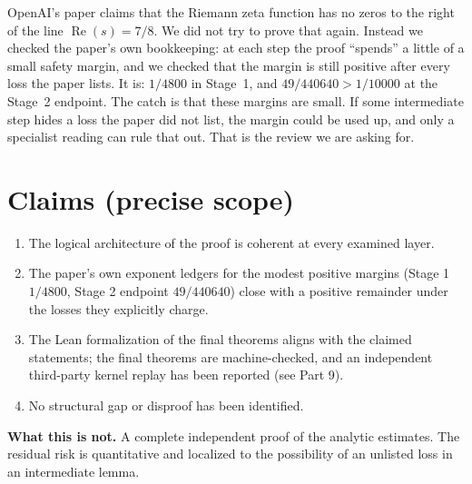 \documentclass[11pt]{article}
\begin{document}
\begin{tcolorbox}[colback=plain,colframe=orange!60!black,boxrule=0.5pt,arc=2pt,left=10pt,right=10pt,top=6pt,bottom=6pt,title=\textbf{Summary for non-specialists},fonttitle=\small,colbacktitle=orange!60!black]
OpenAI's paper claims that the Riemann zeta function has no zeros to the right of the line $\operatorname{Re}(s)=7/8$. We did not try to prove that again. Instead we checked the paper's own bookkeeping: at each step the proof ``spends'' a little of a small safety margin, and we checked that the margin is still positive after every loss the paper lists. It is: $1/4800$ in Stage~1, and $49/440640 > 1/10000$ at the Stage~2 endpoint. The catch is that these margins are small. If some intermediate step hides a loss the paper did not list, the margin could be used up, and only a specialist reading can rule that out. That is the review we are asking for.
\end{tcolorbox}

\section{Claims (precise scope)}
\begin{enumerate}[leftmargin=1.6em,itemsep=0.3em]
\item The logical architecture of the proof is coherent at every examined layer.
\item The paper's own exponent ledgers for the modest positive margins (Stage 1 $1/4800$, Stage 2 endpoint $49/440640$) close with a positive remainder under the losses they explicitly charge.
\item The Lean formalization of the final theorems aligns with the claimed statements; the final theorems are machine-checked, and an independent third-party kernel replay has been reported (see Part 9).
\item No structural gap or disproof has been identified.
\end{enumerate}
\textbf{What this is not.} A complete independent proof of the analytic estimates. The residual risk is quantitative and localized to the possibility of an unlisted loss in an intermediate lemma.
\end{document}
